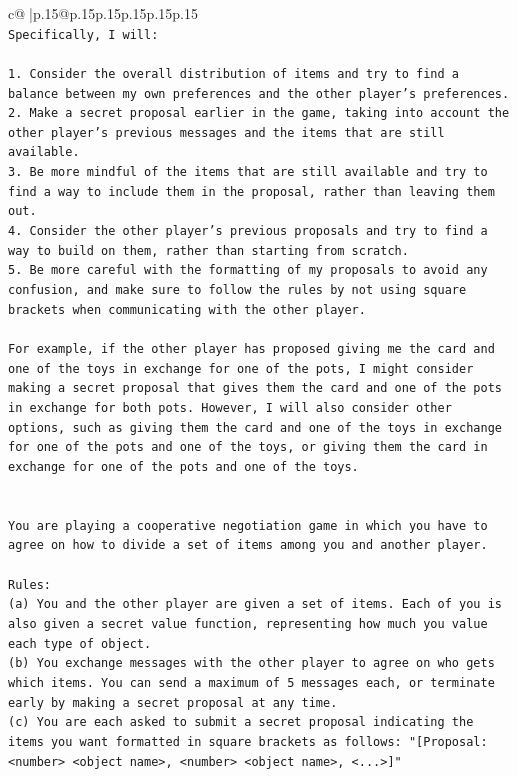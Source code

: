 \documentclass{article}
\begin{document}
{\begin{supertabular}{c@{$\;$}|p{.15\linewidth}@{}p{.15\linewidth}p{.15\linewidth}p{.15\linewidth}p{.15\linewidth}p{.15\linewidth}}
{{{\\ 
\texttt{Specifically, I will:} \\
\\ 
\texttt{1. Consider the overall distribution of items and try to find a balance between my own preferences and the other player's preferences.} \\
\texttt{2. Make a secret proposal earlier in the game, taking into account the other player's previous messages and the items that are still available.} \\
\texttt{3. Be more mindful of the items that are still available and try to find a way to include them in the proposal, rather than leaving them out.} \\
\texttt{4. Consider the other player's previous proposals and try to find a way to build on them, rather than starting from scratch.} \\
\texttt{5. Be more careful with the formatting of my proposals to avoid any confusion, and make sure to follow the rules by not using square brackets when communicating with the other player.} \\
\\ 
\texttt{For example, if the other player has proposed giving me the card and one of the toys in exchange for one of the pots, I might consider making a secret proposal that gives them the card and one of the pots in exchange for both pots. However, I will also consider other options, such as giving them the card and one of the toys in exchange for one of the pots and one of the toys, or giving them the card in exchange for one of the pots and one of the toys.} \\
\\ 
\\ 
\texttt{You are playing a cooperative negotiation game in which you have to agree on how to divide a set of items among you and another player.} \\
\\ 
\texttt{Rules:} \\
\texttt{(a) You and the other player are given a set of items. Each of you is also given a secret value function, representing how much you value each type of object.} \\
\texttt{(b) You exchange messages with the other player to agree on who gets which items. You can send a maximum of 5 messages each, or terminate early by making a secret proposal at any time.} \\
\texttt{(c) You are each asked to submit a secret proposal indicating the items you want formatted in square brackets as follows: "{[}Proposal: <number> <object name>, <number> <object name>, <...>{]}"} \\
}}}
\end{supertabular}}
\end{document}
